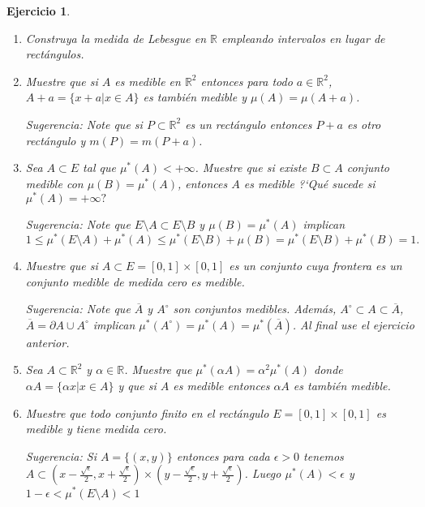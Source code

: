 \documentclass[twoside,12pt,a4 paper,openright]{book}
\newtheorem{ejer}[claim]{Ejercicio}
\begin{document}
\begin{ejer}  \ {} \begin{enumerate}
 
\item Construya la medida de Lebesgue en $\mathbb{R}$ empleando intervalos en lugar de rect\'angulos.



\item Muestre que si $A$ es medible en $\mathbb{R}^2$ entonces para todo $a\in \mathbb{R}^2$, $A + a = \{x + a | x\in A\}$ es tambi\'en medible y 
$\mu (A)= \mu (A+a)$.  

Sugerencia: Note que  si $P\subset \mathbb R^2$ es un rect\'angulo entonces  $P+a$ es otro rect\'angulo y $m(P)= m(P+a)$.




\item Sea $A\subset E$ tal que $\mu^*(A)<+\infty$. Muestre que si existe $B\subset A$ conjunto medible con $\mu(B) = \mu^*(A)$, entonces $A$ es medible ?`Qu\'e sucede si $\mu^*(A) = +\infty ?$

Sugerencia: Note que $E\setminus A \subset E\setminus B  $ y $\mu(B) = \mu^*(A)$  implican 
$$1 \leq \mu^{*}(E\setminus A )  + \mu^{*}(  A )  \leq \mu^{*}(E\setminus B )  + \mu ( B ) = \mu^* (E\setminus B )  + \mu^* ( B )  = 1.$$

\item Muestre que si $A\subset E=[0,1]\times [0,1]$ es un conjunto cuya frontera es un conjunto medible de medida cero es medible.

Sugerencia: Note que $\overline{A}$ y  $A^{\circ}$  son conjuntos medibles. Adem\'as, $A^{\circ} \subset A \subset \overline{A}$, $ \overline{A} = \partial A \cup A^{\circ}$  implican   
$\mu^{*} (A^{\circ}) =\mu^{*} (   A ) = \mu^{*} (  \overline{A})$. Al final use el ejercicio anterior.

\item Sea $A\subset \mathbb{R}^2$ y $\alpha\in \mathbb{R}$. Muestre que $\mu^*(\alpha A) =  \alpha^2\mu^*(A)$ donde $\alpha A = \{\alpha x | x\in A\}$ y que si $A$ es medible entonces $\alpha A$ es tambi\'en medible.


\item Muestre que todo conjunto finito en el rect\'angulo $E=[0,1]\times [0,1]$   es medible y tiene medida cero. 


Sugerencia: Si $A=\{(x,y) \}$ entonces para cada $\epsilon >0 $ tenemos $A\subset (x-\frac{\sqrt{\epsilon}}{2}, x+\frac{\sqrt{\epsilon}}{2}  ) \times  (y-\frac{\sqrt{\epsilon}}{2}, y+\frac{\sqrt{\epsilon}}{2}  )$. Luego $\mu^* (A) <\epsilon $  y  $1-\epsilon < \mu^*(E\setminus A)  <1$


\end{enumerate}
\end{ejer}
\end{document}
